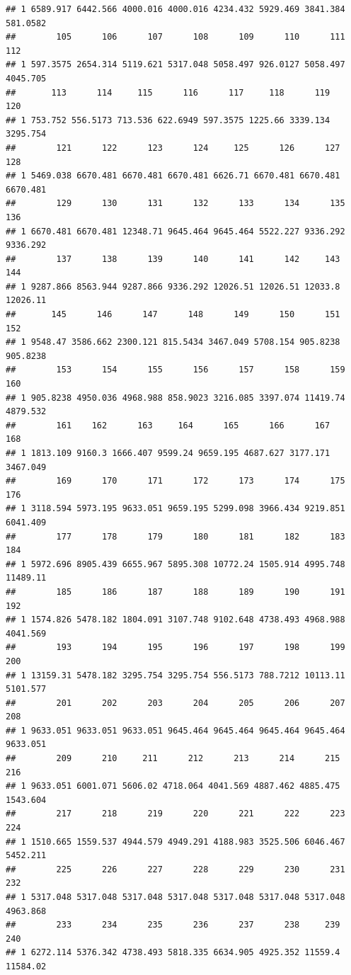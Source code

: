 \documentclass[
]{book}
\begin{document}
\begin{verbatim}
## 1 6589.917 6442.566 4000.016 4000.016 4234.432 5929.469 3841.384 581.0582
##        105      106      107      108      109      110      111      112
## 1 597.3575 2654.314 5119.621 5317.048 5058.497 926.0127 5058.497 4045.705
##       113      114     115      116      117     118      119      120
## 1 753.752 556.5173 713.536 622.6949 597.3575 1225.66 3339.134 3295.754
##        121      122      123      124     125      126      127      128
## 1 5469.038 6670.481 6670.481 6670.481 6626.71 6670.481 6670.481 6670.481
##        129      130      131      132      133      134      135      136
## 1 6670.481 6670.481 12348.71 9645.464 9645.464 5522.227 9336.292 9336.292
##        137      138      139      140      141      142     143      144
## 1 9287.866 8563.944 9287.866 9336.292 12026.51 12026.51 12033.8 12026.11
##       145      146      147      148      149      150      151      152
## 1 9548.47 3586.662 2300.121 815.5434 3467.049 5708.154 905.8238 905.8238
##        153      154      155      156      157      158      159      160
## 1 905.8238 4950.036 4968.988 858.9023 3216.085 3397.074 11419.74 4879.532
##        161    162      163     164      165      166      167      168
## 1 1813.109 9160.3 1666.407 9599.24 9659.195 4687.627 3177.171 3467.049
##        169      170      171      172      173      174      175      176
## 1 3118.594 5973.195 9633.051 9659.195 5299.098 3966.434 9219.851 6041.409
##        177      178      179      180      181      182      183      184
## 1 5972.696 8905.439 6655.967 5895.308 10772.24 1505.914 4995.748 11489.11
##        185      186      187      188      189      190      191      192
## 1 1574.826 5478.182 1804.091 3107.748 9102.648 4738.493 4968.988 4041.569
##        193      194      195      196      197      198      199      200
## 1 13159.31 5478.182 3295.754 3295.754 556.5173 788.7212 10113.11 5101.577
##        201      202      203      204      205      206      207      208
## 1 9633.051 9633.051 9633.051 9645.464 9645.464 9645.464 9645.464 9633.051
##        209      210     211      212      213      214      215      216
## 1 9633.051 6001.071 5606.02 4718.064 4041.569 4887.462 4885.475 1543.604
##        217      218      219      220      221      222      223      224
## 1 1510.665 1559.537 4944.579 4949.291 4188.983 3525.506 6046.467 5452.211
##        225      226      227      228      229      230      231      232
## 1 5317.048 5317.048 5317.048 5317.048 5317.048 5317.048 5317.048 4963.868
##        233      234      235      236      237      238     239      240
## 1 6272.114 5376.342 4738.493 5818.335 6634.905 4925.352 11559.4 11584.02

\end{verbatim}
\end{document}

